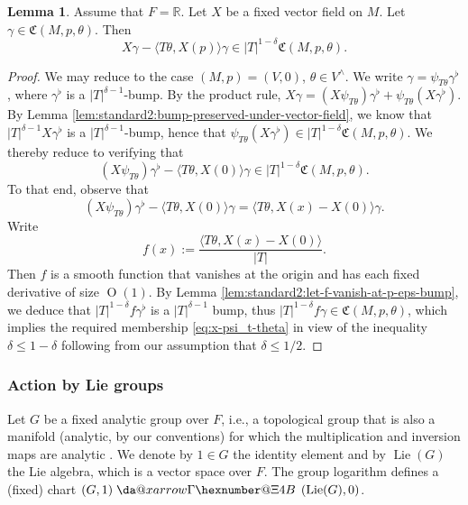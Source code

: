 \documentclass[reqno]{amsart}
\makeatletter
\newcommand*{\da@rightarrow}{\mathchar"0\hexnumber@\symAMSa 4B }
\newcommand*{\xdashrightarrow}[2][]{%
  \mathrel{%
    \mathpalette{\da@xarrow{#1}{#2}{}\da@rightarrow{\,}{}}{}%
  }%
}
\newcommand*{\da@xarrow}[7]{%
  \sbox0{$\ifx#7\scriptstyle\scriptscriptstyle\else\scriptstyle\fi#5#1#6\m@th$}%
  \sbox2{$\ifx#7\scriptstyle\scriptscriptstyle\else\scriptstyle\fi#5#2#6\m@th$}%
  \sbox4{$#7\dabar@\m@th$}%
  \dimen@=\wd0 %
  \ifdim\wd2 >\dimen@
    \dimen@=\wd2 %
  \fi
  \count@=2 %
  \def\da@bars{\dabar@\dabar@}%
  \@whiledim\count@\wd4<\dimen@\do{%
    \advance\count@\@ne
    \expandafter\def\expandafter\da@bars\expandafter{%
      \da@bars
      \dabar@ 
    }%
  }%
  \mathrel{#3}%
  \mathrel{%
    \mathop{\da@bars}\limits
    \ifx\\#1\\%
    \else
      _{\copy0}%
    \fi
    \ifx\\#2\\%
    \else
      ^{\copy2}%
    \fi
  }%
  \mathrel{#4}%
}
\DeclareMathOperator{\Lie}{Lie}
\def\O{\operatorname{O}}
\theoremstyle{plain} \newtheorem{theorem} {Theorem}
\theoremstyle{definition} \newtheorem{definition} [theorem] {Definition}
\theoremstyle{itplain} %
\newtheorem{lemma}[theorem]{Lemma}
\numberwithin{equation}{section}
\numberwithin{theorem}{section}
\renewcommand{\leq}{\leqslant}
\makeatother
\begin{document}
\begin{lemma}\label{lem:archimedean-vector-field-act-on-C}
  Assume that $F = \mathbb{R}$.  Let $X$ be a fixed vector field on $M$.  Let $\gamma \in \mathfrak{C}(M,p,\theta)$.  Then
  \begin{equation*}
    X \gamma - \langle T \theta, X(p) \rangle \gamma
    \in
    |T|^{1-\delta}
    \mathfrak{C}(M,p,\theta).
  \end{equation*}
\end{lemma}
\begin{proof}
  We may reduce to the case $(M,p) = (V,0)$, $\theta \in V^\wedge$.  We write $\gamma = \psi_{T \theta} \gamma^{\flat}$, where $\gamma^{\flat}$ is a $|T|^{\delta-1}$-bump.  By the product rule, $X \gamma = (X \psi_{T \theta}) \gamma^{\flat} + \psi_{T \theta} (X \gamma^{\flat})$.  By Lemma \ref{lem:standard2:bump-preserved-under-vector-field}, we know that $|T|^{\delta - 1} X  \gamma^{\flat}$ is a $|T|^{\delta-1}$-bump, hence that $\psi_{T \theta} (X \gamma^{\flat}) \in |T|^{1- \delta} \mathfrak{C}(M,p,\theta)$.  We thereby reduce to verifying that
  \begin{equation}\label{eq:x-psi_t-theta}
    (X \psi_{T \theta}) \gamma^{\flat} - \langle T \theta, X(0) \rangle \gamma \in |T|^{1-\delta} \mathfrak{C}(M,p,\theta).
  \end{equation}
  To that end, observe that
  \begin{equation*}
    (X \psi_{T \theta}) \gamma^{\flat} - \langle T \theta, X(0) \rangle \gamma
    =
    \langle
    T \theta, X(x) - X(0)
    \rangle
    \gamma.
  \end{equation*}
  Write
  \begin{equation*}
    f(x) :=
    \frac{
      \langle
      T \theta, X(x) - X(0)
      \rangle
    }{
      |T|
    }.
  \end{equation*}
  Then $f$ is a smooth function that vanishes at the origin and has each fixed derivative of size $\O(1)$.  By Lemma \ref{lem:standard2:let-f-vanish-at-p-eps-bump}, we deduce that $|T|^{1 - \delta} f \gamma^{\flat}$ is a $|T|^{\delta-1}$ bump, thus $|T|^{1- \delta} f \gamma \in \mathfrak{C}(M,p,\theta)$, which implies the required membership \eqref{eq:x-psi_t-theta} in view of the inequality $\delta \leq 1 - \delta$ following from our assumption that $\delta \leq 1/2$.
\end{proof}


\subsubsection{Action by Lie groups}\label{sec:translation}
Let $G$ be a fixed analytic group over $F$, i.e., a topological group that is also a manifold (analytic, by our conventions) for which the multiplication and inversion maps are analytic \cite[\S II.IV]{MR2179691}.  We denote by $1 \in G$ the identity element and by $\Lie(G)$ the Lie algebra, which is a vector space over $F$.  The group logarithm defines a (fixed) chart $(G,1) \xdashrightarrow{} (\Lie(G), 0)$.
\end{document}
